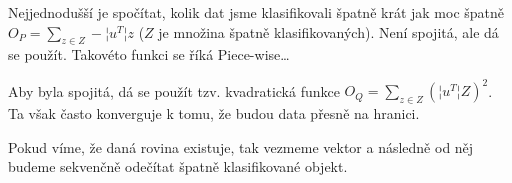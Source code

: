 \documentclass[12pt]{article}					%
\begin{document}
        \begin{definice}
            Nejjednodušší je spočítat, kolik dat jsme klasifikovali špatně krát jak moc špatně $O_P = \sum_{z \in Z} - ¦u^T¦z$ ($Z$ je množina špatně klasifikovaných). Není spojitá, ale dá se použít. Takovéto funkci se říká Piece-wise…

            Aby byla spojitá, dá se použít tzv. kvadratická funkce $O_Q = \sum_{z \in Z}(¦u^T¦Z)^2$. Ta však často konverguje k tomu, že budou data přesně na hranici.
        \end{definice}

        \begin{definice}
            Pokud víme, že daná rovina existuje, tak vezmeme vektor a následně od něj budeme sekvenčně odečítat špatně klasifikované objekt.
        \end{definice}
\end{document}
